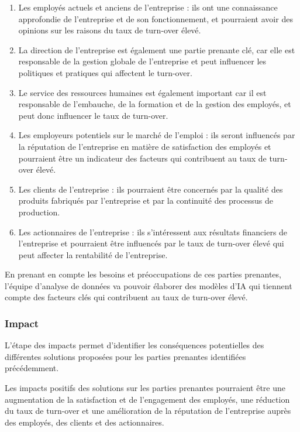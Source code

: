 \begin{enumerate}
    \item Les employés actuels et anciens de l'entreprise : ils ont une connaissance approfondie de l'entreprise et de son fonctionnement, et pourraient avoir des opinions sur les raisons du taux de turn-over élevé. 
    \item La direction de l'entreprise est également une partie prenante clé, car elle est responsable de la gestion globale de l'entreprise et peut influencer les politiques et pratiques qui affectent le turn-over. 
    \item Le service des ressources humaines est également important car il est responsable de l'embauche, de la formation et de la gestion des employés, et peut donc influencer le taux de turn-over. 
    \item Les employeurs potentiels sur le marché de l'emploi : ils seront influencés par la réputation de l'entreprise en matière de satisfaction des employés et pourraient être un indicateur des facteurs qui contribuent au taux de turn-over élevé. 
    \item Les clients de l'entreprise : ils pourraient être concernés par la qualité des produits fabriqués par l'entreprise et par la continuité des processus de production. 
    \item Les actionnaires de l'entreprise : ils s'intéressent aux résultats financiers de l'entreprise et pourraient être influencés par le taux de turn-over élevé qui peut affecter la rentabilité de l'entreprise. 
\end{enumerate}
En prenant en compte les besoins et préoccupations de ces parties prenantes, l'équipe d'analyse de données va pouvoir élaborer des modèles d'IA qui tiennent compte des facteurs clés qui contribuent au taux de turn-over élevé. 

\subsubsection{Impact}
L'étape des impacts permet d'identifier les conséquences potentielles des différentes solutions proposées pour les parties prenantes identifiées précédemment. 

Les impacts positifs des solutions sur les parties prenantes pourraient être une augmentation de la satisfaction et de l'engagement des employés, une réduction du taux de turn-over et une amélioration de la réputation de l'entreprise auprès des employés, des clients et des actionnaires. 


